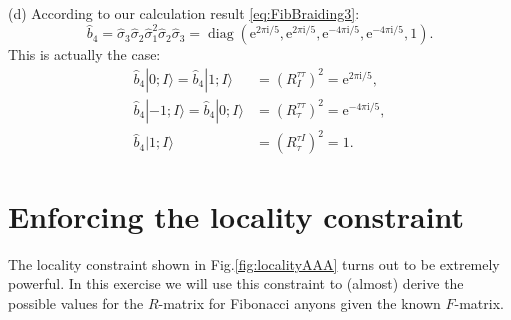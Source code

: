(d) According to our calculation result \eqref{eq:FibBraiding3}:
\begin{equation*}
\hat{b}_{4} =\hat{\sigma }_{3}\hat{\sigma }_{2}\hat{\sigma }_{1}^{2}\hat{\sigma }_{2}\hat{\sigma }_{3} =\operatorname{diag} (\mathrm{e}^{2\pi \mathrm{i} /5} ,\mathrm{e}^{2\pi \mathrm{i} /5} ,\mathrm{e}^{-4\pi \mathrm{i} /5} ,\mathrm{e}^{-4\pi \mathrm{i} /5} ,1).
\end{equation*}
This is actually the case:
\begin{equation*}
\begin{aligned}
\hat{b}_{4} |0;I\rangle =\hat{b}_{4} |1;I \rangle  & =(R_{I}^{\tau \tau } )^{2} =\mathrm{e}^{2\pi \mathrm{i} /5} ,\\
\hat{b}_{4} |-1;I\rangle =\hat{b}_{4} |0;I \rangle  & =(R_{\tau }^{\tau \tau } )^{2} =\mathrm{e}^{-4\pi \mathrm{i} /5} ,\\
\hat{b}_{4} |1;I \rangle  & =(R_{\tau }^{\tau I} )^{2} =1.
\end{aligned}
\end{equation*}


\section{Enforcing the locality constraint}
The locality constraint shown in Fig.\ref{fig:localityAAA} turns out to be extremely powerful. In this exercise we will use this constraint to (almost) derive the possible values for the $R$-matrix for Fibonacci anyons given the known $F$-matrix.

